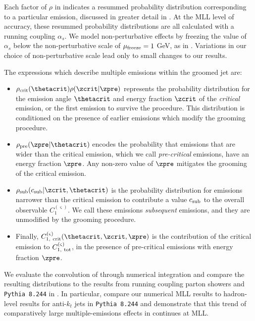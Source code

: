 Each factor of \(\rho\) in  indicates a resummed probability distribution corresponding to a particular emission, discussed in greater detail in .
%
At the MLL level of accuracy, these resummed probability distributions are all calculated with a running coupling \(\alpha_s\).
%
We model non-perturbative effects by freezing the value of \(\alpha_s\) below the non-perturbative scale of \(\mu_{\rm freeze} = 1\) GeV, as in .
%
Variations in our choice of non-perturbative scale lead only to small changes to our results.


The expressions which describe multiple emissions within the groomed jet are:
\begin{itemize}
\item
\(\rho_{\rm crit}(\thetacrit) \rho(\zcrit | \zpre)\) represents the probability distribution for the emission angle \(\thetacrit\) and energy fraction \(\zcrit\) of the \textit{critical} emission, or the first emission to survive the  procedure.
%
This distribution is conditioned on the presence of earlier emissions which modify the grooming procedure.

\item
\(\rho_{\rm pre}(\zpre | \thetacrit)\) encodes the probability that emissions that are wider than the critical emission, which we call \textit{pre-critical} emissions, have an energy fraction \(\zpre\).
%
%
Any non-zero value of \(\zpre\) mitigates the grooming of the critical emission.

\item
\(\rho_{\rm sub}(c_{\rm sub} | \zcrit, \thetacrit)\) is the probability distribution for emissions narrower than the critical emission to contribute a value \(c_{\rm sub}\) to the overall observable \(C^{(\varsigma)}_1\).
%
We call these emissions \textit{subsequent} emissions, and they are unmodified by the grooming procedure.

\item
Finally, \(C^{(\varsigma)}_{1,~\rm crit}(\thetacrit,\zcrit,\zpre)\) is the contribution of the critical emission to \(C^{(\varsigma)}_{1,~\rm tot}\), in the presence of pre-critical emissions with energy fraction \(\zpre\).
\end{itemize}

We evaluate the convolution of  through numerical integration and compare the resulting distributions to the results from running coupling parton showers and \texttt{Pythia 8.244} in .
%
In particular,  compare our numerical MLL results to hadron-level results for anti-\(k_t\) jets in \texttt{Pythia 8.244} and demonstrate that this trend of comparatively large multiple-emissions effects in  continues at MLL.

